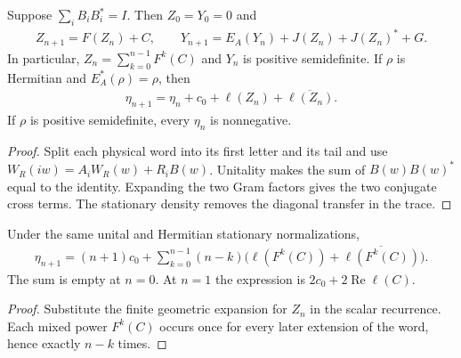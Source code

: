 \begin{lemma}
    \label{lem:uncle_wall_gram_recurrence}
    \leanok
    Suppose $\sum_iB_iB_i^*=I$. Then $Z_0=Y_0=0$ and
    \begin{align}
        Z_{n+1}=F(Z_n)+C,\qquad
        Y_{n+1}=E_A(Y_n)+J(Z_n)+J(Z_n)^*+G.
    \end{align}
    In particular, $Z_n=\sum_{k=0}^{n-1}F^k(C)$ and $Y_n$ is positive
    semidefinite. If $\rho$ is Hermitian and $E_A^*(\rho)=\rho$, then
    \begin{align}
        \eta_{n+1}=\eta_n+c_0+\ell(Z_n)+\overline{\ell(Z_n)}.
    \end{align}
    If $\rho$ is positive semidefinite, every $\eta_n$ is nonnegative.
\end{lemma}
\begin{proof}
    \leanok
    Split each physical word into its first letter and its tail and use
    $W_R(iw)=A_iW_R(w)+R_iB(w)$. Unitality makes the sum of
    $B(w)B(w)^*$ equal to the identity. Expanding the two Gram factors
    gives the two conjugate cross terms. The stationary density removes
    the diagonal transfer in the trace.
\end{proof}

\begin{lemma}
    \label{thm:uncle_wall_gram_finite_sum}
    \leanok
    Under the same unital and Hermitian stationary normalizations,
    \begin{align}
        \eta_{n+1}=(n+1)c_0+
        \sum_{k=0}^{n-1}(n-k)
        \bigl(\ell(F^k(C))+\overline{\ell(F^k(C))}\bigr).
    \end{align}
    The sum is empty at $n=0$. At $n=1$ the expression is
    $2c_0+2\operatorname{Re}\ell(C)$.
\end{lemma}
\begin{proof}
    \leanok
    Substitute the finite geometric expansion for $Z_n$ in the scalar
    recurrence. Each mixed power $F^k(C)$ occurs once for every later
    extension of the word, hence exactly $n-k$ times.
\end{proof}

